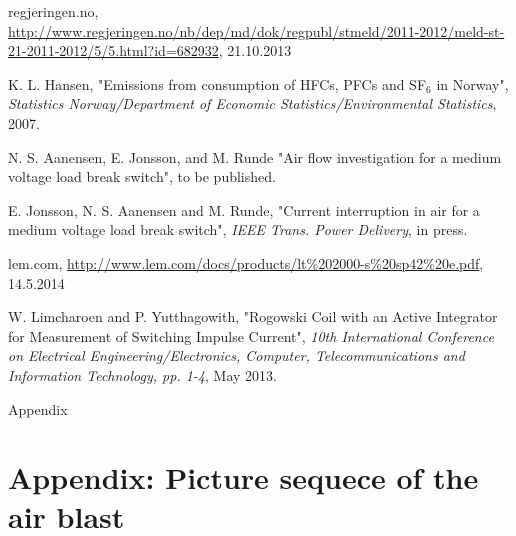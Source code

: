 \documentclass[10pt,b5paper,twoside]{article}
\begin{document}
\begin{thebibliography}{10}
 regjeringen.no, \url{http://www.regjeringen.no/nb/dep/md/dok/regpubl/stmeld/2011-2012/meld-st-21-2011-2012/5/5.html?id=682932}, 21.10.2013

 K. L. Hansen, "Emissions from consumption of HFCs, PFCs and SF$_6$ in Norway", \textit{Statistics Norway/Department of Economic Statistics/Environmental Statistics}, 2007.

 N. S. Aanensen, E. Jonsson, and M. Runde "Air flow investigation for a medium voltage load break switch", to be published.

 E. Jonsson, N. S. Aanensen and M. Runde, "Current interruption in air for a medium voltage load break switch", \textit{IEEE Trans. Power Delivery}, in press.

 lem.com, \url{http://www.lem.com/docs/products/lt\%202000-s\%20sp42\%20e.pdf}, 14.5.2014

 W. Limcharoen and P. Yutthagowith, "Rogowski Coil with an Active Integrator for Measurement of Switching Impulse Current", \textit{10th International Conference on Electrical Engineering/Electronics, Computer, Telecommunications and Information Technology, pp. 1-4}, May 2013.

\end{thebibliography}

\cleardoublepage
\appendix
\vspace*{\fill}
\begingroup
\begin{center}
\huge Appendix
\end{center}
\endgroup
\vspace*{\fill}

\cleardoublepage

\section{Appendix: Picture sequece of the air blast} \label{app:SelfBlast}
\setcounter{figure}{0}
\makeatletter 
\renewcommand{\thefigure}{A.\@arabic\c@figure}
\makeatother
\end{document}
